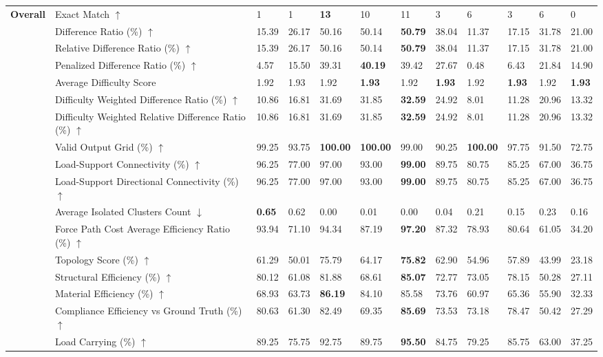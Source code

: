 \begin{table}[!h]
{\begin{tabular}{llllllllllll}
\textbf{Overall} & Exact Match $\uparrow$ & 1 & 1 & \textbf{13} & 10 & 11 & 3 & 6 & 3 & 6 & 0 \\
 & Difference Ratio (\%) $\uparrow$ & 15.39 & 26.17 & 50.16 & 50.14 & \textbf{50.79} & 38.04 & 11.37 & 17.15 & 31.78 & 21.00 \\
 & Relative Difference Ratio (\%) $\uparrow$ & 15.39 & 26.17 & 50.16 & 50.14 & \textbf{50.79} & 38.04 & 11.37 & 17.15 & 31.78 & 21.00 \\
 & Penalized Difference Ratio (\%) $\uparrow$ & 4.57 & 15.50 & 39.31 & \textbf{40.19} & 39.42 & 27.67 & 0.48 & 6.43 & 21.84 & 14.90 \\
 & Average Difficulty Score & 1.92 & 1.93 & 1.92 & \textbf{1.93} & 1.92 & \textbf{1.93} & 1.92 & \textbf{1.93} & 1.92 & \textbf{1.93} \\
 & Difficulty Weighted Difference Ratio (\%) $\uparrow$ & 10.86 & 16.81 & 31.69 & 31.85 & \textbf{32.59} & 24.92 & 8.01 & 11.28 & 20.96 & 13.32 \\
 & Difficulty Weighted Relative Difference Ratio (\%) $\uparrow$ & 10.86 & 16.81 & 31.69 & 31.85 & \textbf{32.59} & 24.92 & 8.01 & 11.28 & 20.96 & 13.32 \\
 & Valid Output Grid (\%) $\uparrow$ & 99.25 & 93.75 & \textbf{100.00} & \textbf{100.00} & 99.00 & 90.25 & \textbf{100.00} & 97.75 & 91.50 & 72.75 \\
 & Load-Support Connectivity (\%) $\uparrow$ & 96.25 & 77.00 & 97.00 & 93.00 & \textbf{99.00} & 89.75 & 80.75 & 85.25 & 67.00 & 36.75 \\
 & Load-Support Directional Connectivity (\%) $\uparrow$ & 96.25 & 77.00 & 97.00 & 93.00 & \textbf{99.00} & 89.75 & 80.75 & 85.25 & 67.00 & 36.75 \\
 & Average Isolated Clusters Count $\downarrow$ & \textbf{0.65} & 0.62 & 0.00 & 0.01 & 0.00 & 0.04 & 0.21 & 0.15 & 0.23 & 0.16 \\
 & Force Path Cost Average Efficiency Ratio (\%) $\uparrow$ & 93.94 & 71.10 & 94.34 & 87.19 & \textbf{97.20} & 87.32 & 78.93 & 80.64 & 61.05 & 34.20 \\
 & Topology Score (\%) $\uparrow$ & 61.29 & 50.01 & 75.79 & 64.17 & \textbf{75.82} & 62.90 & 54.96 & 57.89 & 43.99 & 23.18 \\
 & Structural Efficiency (\%) $\uparrow$ & 80.12 & 61.08 & 81.88 & 68.61 & \textbf{85.07} & 72.77 & 73.05 & 78.15 & 50.28 & 27.11 \\
 & Material Efficiency (\%) $\uparrow$ & 68.93 & 63.73 & \textbf{86.19} & 84.10 & 85.58 & 73.76 & 60.97 & 65.36 & 55.90 & 32.33 \\
 & Compliance Efficiency vs Ground Truth (\%) $\uparrow$ & 80.63 & 61.30 & 82.49 & 69.35 & \textbf{85.69} & 73.53 & 73.18 & 78.47 & 50.42 & 27.29 \\
 & Load Carrying (\%) $\uparrow$ & 89.25 & 75.75 & 92.75 & 89.75 & \textbf{95.50} & 84.75 & 79.25 & 85.75 & 63.00 & 37.25 \\
    \bottomrule
  \end{tabular}
  }
\end{table}